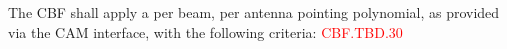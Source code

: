 The CBF shall apply a per beam, per antenna pointing polynomial, as provided via the
CAM interface, with the following criteria: \textcolor{red}{CBF.TBD.30}

